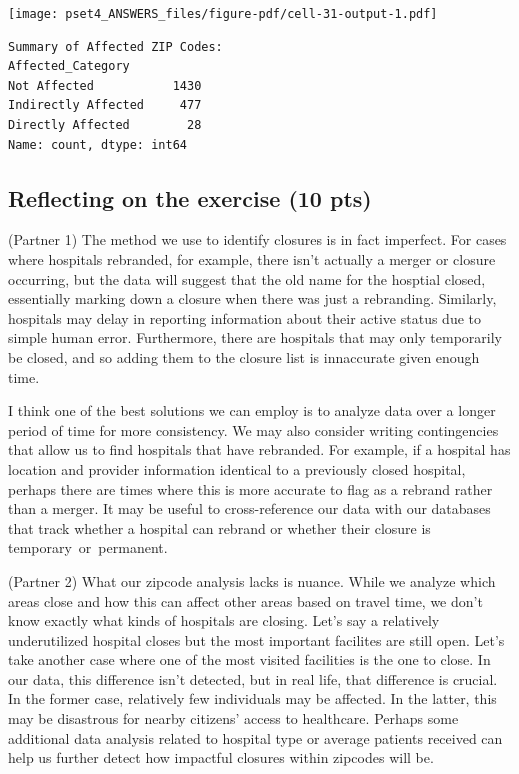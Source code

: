 \documentclass[
  letterpaper,
  DIV=11,
  numbers=noendperiod]{scrartcl}
\begin{document}
\texttt{[image: pset4\_ANSWERS\_files/figure-pdf/cell-31-output-1.pdf]}

\begin{verbatim}
Summary of Affected ZIP Codes:
Affected_Category
Not Affected           1430
Indirectly Affected     477
Directly Affected        28
Name: count, dtype: int64
\end{verbatim}

\subsection{Reflecting on the exercise (10
pts)}\label{reflecting-on-the-exercise-10-pts}

(Partner 1) The method we use to identify closures is in fact imperfect.
For cases where hospitals rebranded, for example, there isn't actually a
merger or closure occurring, but the data will suggest that the old name
for the hosptial closed, essentially marking down a closure when there
was just a rebranding. Similarly, hospitals may delay in reporting
information about their active status due to simple human error.
Furthermore, there are hospitals that may only temporarily be closed,
and so adding them to the closure list is innaccurate given enough time.

I think one of the best solutions we can employ is to analyze data over
a longer period of time for more consistency. We may also consider
writing contingencies that allow us to find hospitals that have
rebranded. For example, if a hospital has location and provider
information identical to a previously closed hospital, perhaps there are
times where this is more accurate to flag as a rebrand rather than a
merger. It may be useful to cross-reference our data with our databases
that track whether a hospital can rebrand or whether their closure is
temporary~or~permanent.

(Partner 2) What our zipcode analysis lacks is nuance. While we analyze
which areas close and how this can affect other areas based on travel
time, we don't know exactly what kinds of hospitals are closing. Let's
say a relatively underutilized hospital closes but the most important
facilites are still open. Let's take another case where one of the most
visited facilities is the one to close. In our data, this difference
isn't detected, but in real life, that difference is crucial. In the
former case, relatively few individuals may be affected. In the latter,
this may be disastrous for nearby citizens' access to healthcare.
Perhaps some additional data analysis related to hospital type or
average patients received can help us further detect how impactful
closures within zipcodes will be.
\end{document}
